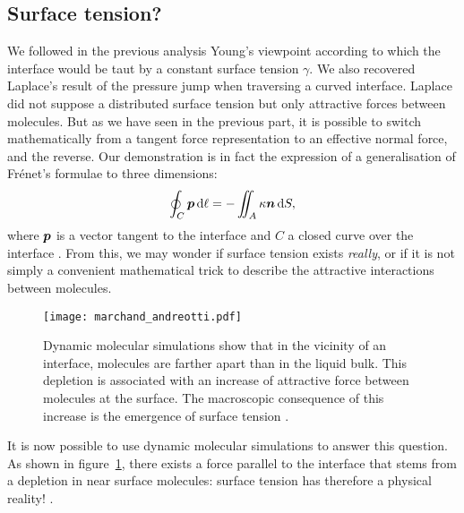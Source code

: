 \subsection{Surface tension?}
We followed in the previous analysis Young's viewpoint according to which the interface would be taut by a constant surface tension $\gamma$. We also recovered Laplace's result of the pressure jump when traversing a curved interface. Laplace did not suppose a distributed surface tension but only attractive forces between molecules. But as we have seen in the previous part, it is possible to switch mathematically from a tangent force representation to an effective normal force, and the reverse. Our demonstration is in fact the expression of a generalisation of Frénet's formulae to three dimensions:
\begin{equation}
\oint_C \bp\,\mathrm d\ell = -\iint_A \kappa \bn\, \mathrm dS,
\label{eq:2Dfrenet}
\end{equation}
where $\bp$ is a vector tangent to the interface and $C$ a closed curve over the interface \citep{Tryggvason2011}. From this, we may wonder if surface tension exists \textit{really}, or if it is not simply a convenient mathematical trick to describe the attractive interactions between molecules.
\begin{figure}[htbp]
\begin{center}
\texttt{[image: marchand\_andreotti.pdf]} 
\end{center}
\caption{Dynamic molecular simulations show that in the vicinity of an interface, molecules are farther apart than in the liquid bulk. This depletion is associated with an increase of attractive force between molecules at the surface. The macroscopic consequence of this increase is the emergence of surface tension \citep{Marchand2011}.}
\label{fig:marchand}
\end{figure}
It is now possible to use dynamic molecular simulations to answer this question. As shown in figure~\ref{fig:marchand}, there exists a force parallel to the interface that stems from a depletion in near surface molecules: surface tension has therefore a physical reality! \citep{Berry1971,Marchand2011}.
 

